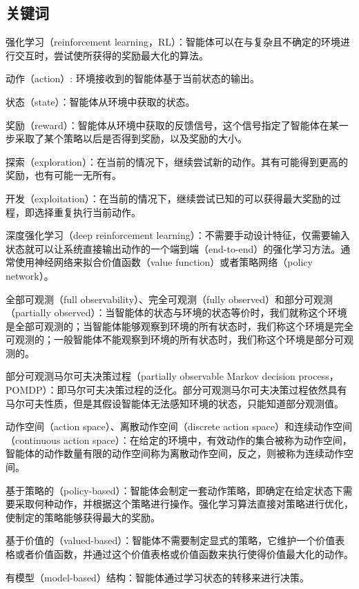 \subsection{关键词}

强化学习（reinforcement learning，RL）：智能体可以在与复杂且不确定的环境进行交互时，尝试使所获得的奖励最大化的算法。

动作（action）: 环境接收到的智能体基于当前状态的输出。

状态（state）：智能体从环境中获取的状态。

奖励（reward）：智能体从环境中获取的反馈信号，这个信号指定了智能体在某一步采取了某个策略以后是否得到奖励，以及奖励的大小。

探索（exploration）：在当前的情况下，继续尝试新的动作。其有可能得到更高的奖励，也有可能一无所有。

开发（exploitation）：在当前的情况下，继续尝试已知的可以获得最大奖励的过程，即选择重复执行当前动作。

深度强化学习（deep reinforcement learning）：不需要手动设计特征，仅需要输入状态就可以让系统直接输出动作的一个端到端（end-to-end）的强化学习方法。通常使用神经网络来拟合价值函数（value function）或者策略网络（policy network）。

全部可观测（full observability）、完全可观测（fully observed）和部分可观测（partially observed）：当智能体的状态与环境的状态等价时，我们就称这个环境是全部可观测的；当智能体能够观察到环境的所有状态时，我们称这个环境是完全可观测的；一般智能体不能观察到环境的所有状态时，我们称这个环境是部分可观测的。

部分可观测马尔可夫决策过程（partially observable Markov decision process，POMDP）：即马尔可夫决策过程的泛化。部分可观测马尔可夫决策过程依然具有马尔可夫性质，但是其假设智能体无法感知环境的状态，只能知道部分观测值。

动作空间（action space）、离散动作空间（discrete action space）和连续动作空间（continuous action space）：在给定的环境中，有效动作的集合被称为动作空间，智能体的动作数量有限的动作空间称为离散动作空间，反之，则被称为连续动作空间。

基于策略的（policy-based）：智能体会制定一套动作策略，即确定在给定状态下需要采取何种动作，并根据这个策略进行操作。强化学习算法直接对策略进行优化，使制定的策略能够获得最大的奖励。

基于价值的（valued-based）：智能体不需要制定显式的策略，它维护一个价值表格或者价值函数，并通过这个价值表格或价值函数来执行使得价值最大化的动作。

有模型（model-based）结构：智能体通过学习状态的转移来进行决策。

